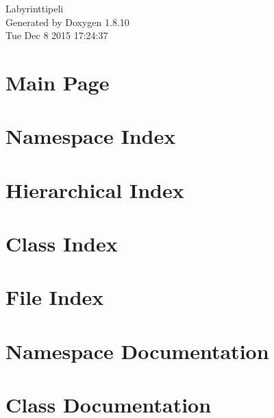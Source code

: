 \documentclass[twoside]{book}
\newcommand{\+}{\discretionary{\mbox{\scriptsize$\hookleftarrow$}}{}{}}
\newcommand{\clearemptydoublepage}{%
  \newpage{\pagestyle{empty}\cleardoublepage}%
}
\begin{document}
\hypersetup{pageanchor=false,
             bookmarks=true,
             bookmarksnumbered=true,
             pdfencoding=unicode
            }
\begin{titlepage}
\vspace*{7cm}
\begin{center}%
{\Large Labyrinttipeli }\\
\vspace*{1cm}
{\large Generated by Doxygen 1.8.10}\\
\vspace*{0.5cm}
{\small Tue Dec 8 2015 17:24:37}\\
\end{center}
\end{titlepage}
\clearemptydoublepage
\tableofcontents
\clearemptydoublepage
{}
\hypersetup{pageanchor=true}

\chapter{Main Page}
\label{index}\hypertarget{index}{}
\chapter{Namespace Index}

\chapter{Hierarchical Index}

\chapter{Class Index}

\chapter{File Index}

\chapter{Namespace Documentation}

\chapter{Class Documentation}




























\end{document}
